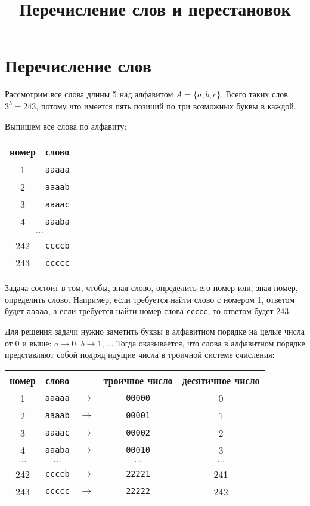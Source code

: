 \documentclass{article}
\title{Перечисление слов и перестановок}
\author{}
\date{}
\begin{document}
\maketitle

\section{Перечисление слов}
Рассмотрим все слова длины 5 над алфавитом $A = \{a,b,c\}$. Всего таких слов $3^5=243$, потому что имеется пять позиций по три возможных буквы в каждой.

Выпишем все слова по алфавиту:

\begin{center}
\begin{tabular}{cc}
	номер & слово \\
	\hline
	1 & \verb|aaaaa| \\
	2 & \verb|aaaab| \\
	3 & \verb|aaaac| \\
	4 & \verb|aaaba| \\
	\multicolumn{2}{c}{$\cdots$} \\
	242 & \verb|ccccb| \\
	243 & \verb|ccccc|
\end{tabular}
\end{center}

Задача состоит в том, чтобы, зная слово, определить его номер или, зная номер, определить слово. Например, если требуется найти слово с номером 1, ответом будет \verb|aaaaa|, а если требуется найти номер слова \verb|ccccc|, то ответом будет 243.

Для решения задачи нужно заметить буквы в алфавитном порядке на целые числа от 0 и выше: $a\rightarrow0$, $b\rightarrow1$, ...
Тогда оказывается, что слова в алфавитном порядке представляют собой подряд идущие числа в троичной системе счисления:

\begin{center}
	\begin{tabular}{ccccc}
		номер & слово & & троичное число & десятичное число \\
		\hline
		1 & \verb|aaaaa| & $\rightarrow$ & \verb|00000| & 0 \\
		2 & \verb|aaaab| & $\rightarrow$ & \verb|00001| & 1 \\
		3 & \verb|aaaac| & $\rightarrow$ & \verb|00002| & 2 \\
		4 & \verb|aaaba| & $\rightarrow$ & \verb|00010| & 3 \\
        $\cdots$&$\cdots$&&$\cdots$&$\cdots$\\
		242 & \verb|ccccb| & $\rightarrow$ & \verb|22221| & 241 \\
		243 & \verb|ccccc| & $\rightarrow$ & \verb|22222| & 242
	\end{tabular}
\end{center}
\end{document}
